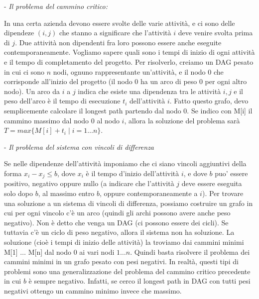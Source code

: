 \documentclass[a4paper,10pt]{article} %
\begin{document}
- \emph {Il problema del cammino critico:} \par
In una certa azienda devono essere svolte delle varie attività, e ci sono delle dipendeze $(i, j)$ che stanno a significare che l'attività $i$ deve venire svolta prima di $j$. Due attività non dipendenti fra loro possono essere anche eseguite contemporaneamente. Vogliamo sapere quali sono i tempi di inizio di ogni attività e il tempo di completamento del progetto. Per risolverlo, creiamo un DAG pesato in cui ci sono $n$ nodi, ognuno rappresentante un'attività, e il nodo 0 che corrisponde all'inizio del progetto (il nodo 0 ha un arco di peso 0 per ogni altro nodo). Un arco da $i$ a $j$ indica che esiste una dipendenza tra le attività $i, j$ e il peso dell'arco è il tempo di esecuzione $t_i$ dell'attività $i$. Fatto questo grafo, devo semplicemente calcolare il longest path partendo dal nodo 0. Se indico con M[i] il cammino massimo dal nodo 0 al nodo $i$, allora la soluzione del problema sarà $T = max\{ M[i] + t_i \mid i = 1 \ldots n \}$. 
\medskip

- \emph {Il problema del sistema con vincoli di differenza} \par
Se nelle dipendenze dell'attività imponiamo che ci siano vincoli aggiuntivi della forma $x_i - x_j \leq b$, dove $x_i$ è il tempo d'inizio dell'attività $i$, e dove $b$ puo' essere positivo, negativo oppure nullo (a indicare che l'attività $j$ deve essere eseguita solo dopo $b$, al massimo entro $b$, oppure contemporaneamente a $i$). Per trovare una soluzione a un sistema di vincoli di differenza, possiamo costruire un grafo in cui per ogni vincolo c'è un arco (quindi gli archi possono avere anche peso negativo). Non è detto che venga un DAG (ci possono essere dei cicli). Se tuttavia c'è un ciclo di peso negativo, allora il sistema non ha soluzione. La soluzione (cioè i tempi di inizio delle attività) la troviamo dai cammini minimi M[1] $\ldots$ M[n] dal nodo 0 ai vari nodi $1 \ldots n$. Quindi basta risolvere il problema dei cammini minimi in un grafo pesato con pesi negativi. In realtà, questi tipi di problemi sono una generalizzazione del problema del cammino critico precedente in cui $b$ è sempre negativo. Infatti, se cerco il longest path in DAG con tutti pesi negativi ottengo un cammino minimo invece che massimo.
\medskip
\end{document}
